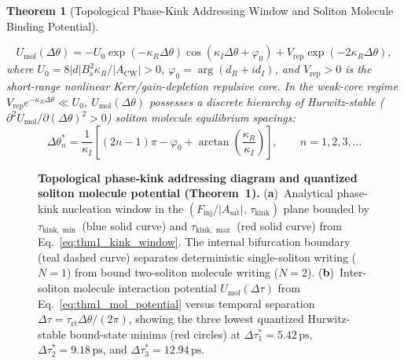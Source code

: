 \documentclass[11pt,letterpaper]{article}
\newtheorem{theorem}{Theorem}
\begin{document}
\begin{theorem}[Topological Phase-Kink Addressing Window and Soliton Molecule Binding Potential]
\begin{enumerate}
    \begin{equation}
    U_{\mathrm{mol}}(\Delta\theta) = -U_0 \exp(-\kappa_R \Delta\theta)\cos(\kappa_I \Delta\theta + \varphi_0) + V_{\mathrm{rep}}\exp(-2\kappa_R \Delta\theta),
    \label{eq:thm1_mol_potential}
    \end{equation}
    where $U_0 = 8|d| B_{\mathrm{s}}^2 \kappa_R / |A_{\mathrm{CW}}| > 0$, $\varphi_0 = \arg(d_R + i d_I)$, and $V_{\mathrm{rep}} > 0$ is the short-range nonlinear Kerr/gain-depletion repulsive core. In the weak-core regime $V_{\mathrm{rep}} e^{-\kappa_R \Delta\theta} \ll U_0$, $U_{\mathrm{mol}}(\Delta\theta)$ possesses a discrete hierarchy of Hurwitz-stable ($\partial^2 U_{\mathrm{mol}}/\partial(\Delta\theta)^2 > 0$) soliton molecule equilibrium spacings:
    \begin{equation}
    \Delta\theta_n^* = \frac{1}{\kappa_I}\left[ (2n - 1)\pi - \varphi_0 + \arctan\!\left(\frac{\kappa_R}{\kappa_I}\right) \right], \qquad n = 1, 2, 3, \dots
    \label{eq:thm1_quantized_spacings}
    \end{equation}
\end{enumerate}
\end{theorem}

\begin{figure}[t!]
\centering
\resizebox{0.97\textwidth}{!}{}
\caption{\textbf{Topological phase-kink addressing diagram and quantized soliton molecule potential (Theorem~1).} (\textbf{a})~Analytical phase-kink nucleation window in the $(F_{\mathrm{inj}}/|A_{\mathrm{sat}}|,\,\tau_{\mathrm{kink}})$ plane bounded by $\tau_{\mathrm{kink},\min}$ (blue solid curve) and $\tau_{\mathrm{kink},\max}$ (red solid curve) from Eq.~\eqref{eq:thm1_kink_window}. The internal bifurcation boundary (teal dashed curve) separates deterministic single-soliton writing ($N = 1$) from bound two-soliton molecule writing ($N = 2$). (\textbf{b})~Inter-soliton molecule interaction potential $U_{\mathrm{mol}}(\Delta\tau)$ from Eq.~\eqref{eq:thm1_mol_potential} versus temporal separation $\Delta\tau = \tau_{\mathrm{rt}}\Delta\theta/(2\pi)$, showing the three lowest quantized Hurwitz-stable bound-state minima (red circles) at $\Delta\tau_1^* = 5.42\,\mathrm{ps}$, $\Delta\tau_2^* = 9.18\,\mathrm{ps}$, and $\Delta\tau_3^* = 12.94\,\mathrm{ps}$.}
\label{fig:kink_potential}
\end{figure}
\end{document}

